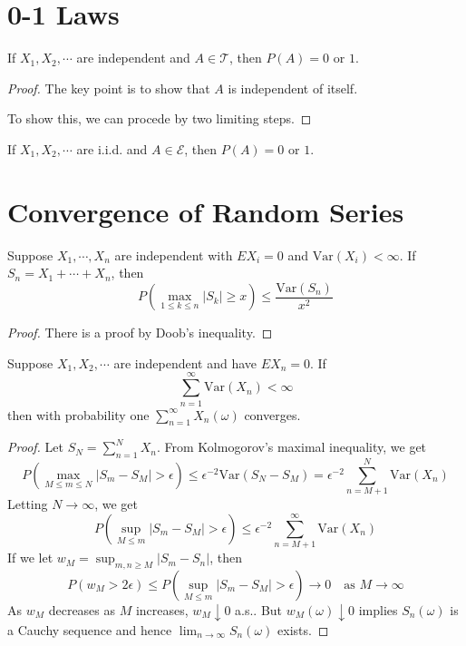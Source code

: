 \section{0-1 Laws}
\begin{theorem}
    If $X_1,X_2,\cdots$ are independent and $A\in\mathcal{T}$, then $P(A)=0$ or $1$.
\end{theorem}
\begin{proof}
    The key point is to show that $A$ is independent of itself.\par
    To show this, we can procede by two limiting steps.
\end{proof}
\begin{theorem}
    If $X_1,X_2,\cdots$ are i.i.d. and $A\in\mathcal{E}$, then $P(A)=0$ or $1$.
\end{theorem}
\begin{lemma}
    
\end{lemma}

\section{Convergence of Random Series}

\begin{theorem}
    Suppose $X_1,\cdots,X_n$ are independent with $EX_i=0$ and $\text{Var}(X_i)<\infty$. If $S_n=X_1+\cdots+X_n$, then
    \[P(\max_{1\le k\le n}\left|S_k\right|\ge x)\le \frac{\text{Var}(S_n)}{x^2}\] 
\end{theorem}
\begin{proof}
    There is a proof by Doob's inequality.
\end{proof}

\begin{theorem}
    Suppose $X_1,X_2,\cdots$ are independent and have $EX_n=0$. If \[\sum_{n=1}^\infty \text{Var}(X_n)<\infty\] 
    then with probability one $\sum_{n=1}^\infty X_n(\omega)$ converges.
\end{theorem}
\begin{proof}
    Let $S_N=\sum_{n=1}^N X_n$. From Kolmogorov's maximal inequality, we get 
    \[P(\max_{M\le m\le N}\left|S_m-S_M\right|>\epsilon)\le \epsilon^{-2}\text{Var}(S_N-S_M)=\epsilon^{-2}\sum_{n=M+1}^N\text{Var}(X_n)\] 
    Letting $N\to\infty$, we get \[P(\sup_{M\le m}\left|S_m-S_M\right|>\epsilon)\le \epsilon^{-2}\sum_{n=M+1}^\infty\text{Var}(X_n)\] 
    If we let $w_M=\sup_{m,n\ge M}\left|S_m-S_n\right|$, then \[P(w_M>2\epsilon)\le P(\sup_{M\le m}\left|S_m-S_M\right|>\epsilon)\to 0\quad\text{as }M\to\infty\]
    As $w_M$ decreases as $M$ increases, $w_M\downarrow 0$ a.s.. But $w_M(\omega)\downarrow 0$ implies $S_n(\omega)$ is a Cauchy sequence
    and hence $\lim_{n\to\infty}S_n(\omega)$ exists.
\end{proof}

